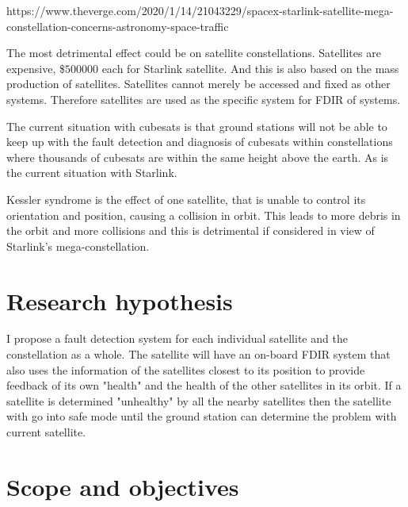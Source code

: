 https://www.theverge.com/2020/1/14/21043229/spacex-starlink-satellite-mega-constellation-concerns-astronomy-space-traffic

The most detrimental effect could be on satellite constellations. Satellites are expensive, \$$500 000$ each for Starlink satellite. And this is also based on the mass production of satellites. Satellites cannot merely be accessed and fixed as other systems. Therefore satellites are used as the specific system for FDIR of systems.

The current situation with cubesats is that ground stations will not be able to keep up with the fault detection and diagnosis of cubesats within constellations where thousands of cubesats are within the same height above the earth. As is the current situation with Starlink.

Kessler syndrome is the effect of one satellite, that is unable to control its orientation and position, causing a collision in orbit. This leads to more debris in the orbit and more collisions and this is detrimental if considered in view of Starlink's mega-constellation.

\section{Research hypothesis}
I propose a fault detection system for each individual satellite and the constellation as a whole. The satellite will have an on-board FDIR system that also uses the information of the satellites closest to its position to provide feedback of its own "health" and the health of the other satellites in its orbit. If a satellite is determined "unhealthy" by all the nearby satellites then the satellite with go into safe mode until the ground station can determine the problem with current satellite.

\section{Scope and objectives}

